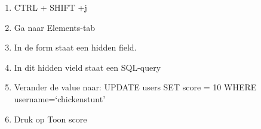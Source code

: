 \begin{enumerate}
  \item CTRL + SHIFT +j
  \item Ga naar Elements-tab
  \item In de form staat een hidden field.
  \item In dit hidden vield staat een SQL-query
  \item Verander de value naar: UPDATE users SET score = 10 WHERE username=`chickenstunt'
  \item Druk op Toon score
\end{enumerate}